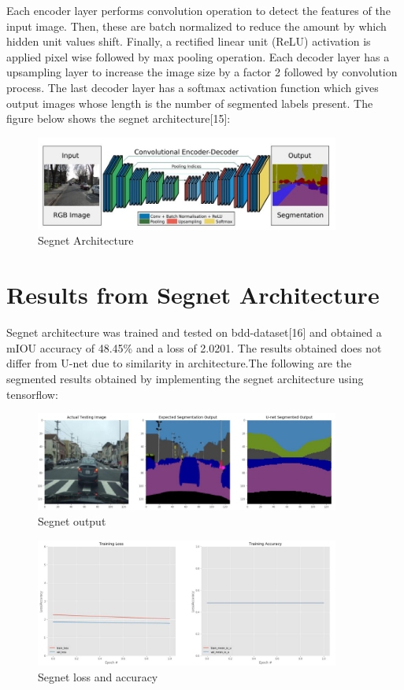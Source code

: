 \documentclass{IEEEtran}
\begin{document}
Each encoder layer performs convolution operation to detect the features of the input image. Then, these are batch normalized to reduce the amount by which hidden unit values shift. Finally, a rectified linear unit (ReLU) activation is applied pixel wise followed by max pooling operation. Each decoder layer has a upsampling layer to increase the image size by a factor 2 followed by convolution process. The last decoder layer has a softmax activation function which gives output images whose length is the number of segmented labels present. The figure below shows the segnet architecture[15]:
\newpage
\begin{figure}[h]
    \centering
    \captionsetup{justification=centering}
    \includegraphics[width=10cm]{segnet}
    \caption{Segnet Architecture}
    \label{fig:Binary class segmented output}
\end{figure}

\section{Results from Segnet Architecture}
Segnet architecture was trained and tested on bdd-dataset[16] and obtained a mIOU accuracy of 48.45\% and a loss of 2.0201. The results obtained does not differ from U-net due to similarity in architecture.The following are the segmented results obtained by implementing the segnet architecture using tensorflow:

\begin{figure}[h]
    \centering
    \captionsetup{justification=centering}
    \includegraphics[width=10cm]{segres}
    \caption{Segnet output}
    \label{fig:Binary class segmented output}
\end{figure}

\begin{figure}[h]
    \centering
    \captionsetup{justification=centering}
    \includegraphics[width=10cm]{segla}
    \caption{Segnet loss and accuracy}
    \label{fig:Binary class segmented output}
\end{figure}
\end{document}
